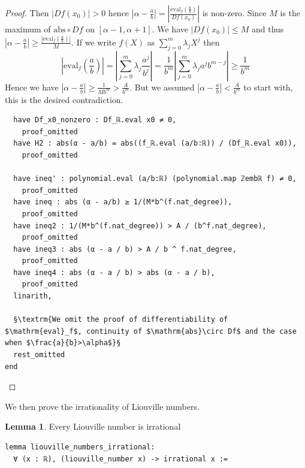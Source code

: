 \documentclass{report}
\theoremstyle{definition}
\newtheorem{lemma}{Lemma}[section]
\begin{document}
\begin{proof}
Then $|Df(x_0)|>0$ hence $\left|\alpha-\frac ab\right|=\left|\frac{\mathrm{eval}_f(\frac a b)}{Df(x_0)}\right|$ is non-zero. Since $M$ is the maximum of $\mathrm{abs}\circ Df$ on $[\alpha-1,\alpha+1]$. We have $|Df(x_0)|\le M$ and thus $\left|\alpha-\frac ab\right|\ge \frac{|\mathrm{eval}_f(\frac a b)|}{M}$. If we write $f(X)$ as $\sum_{j=0}^m \lambda_j X^j$ then
\begin{equation*}
\left|\mathrm{eval}_f\left(\frac a b\right)\right|=\left|\sum_{j=0}^m\lambda_j \frac{a^j}{b^j}\right|= \frac1{b^m}\left|\sum_{j=0}^m\lambda_j a^jb^{m-j}\right|\ge\frac1{b^m}
\end{equation*}
Hence we have $\left|\alpha-\frac a b\right|\ge \frac1{Mb^m}>\frac{A}{b^m}$. But we assumed $\left|\alpha-\frac ab\right|<\frac A{b^m}$ to start with, this is the desired contradiction.

\begin{verbatim}
  have Df_x0_nonzero : Df_ℝ.eval x0 ≠ 0,
    proof_omitted
  have H2 : abs(α - a/b) = abs((f_ℝ.eval (a/b:ℝ)) / (Df_ℝ.eval x0)),
    proof_omitted

  have ineq' : polynomial.eval (a/b:ℝ) (polynomial.map ℤembℝ f) ≠ 0,
    proof_omitted
  have ineq : abs (α - a/b) ≥ 1/(M*b^(f.nat_degree)),
    proof_omitted
  have ineq2 : 1/(M*b^(f.nat_degree)) > A / (b^f.nat_degree),
    proof_omitted
  have ineq3 : abs (α - a / b) > A / b ^ f.nat_degree,
    proof_omitted
  have ineq4 : abs (α - a / b) > abs (α - a / b),
    proof_omitted 
  linarith,
  
  §\textrm{We omit the proof of differentiability of $\mathrm{eval}_f$, continuity of $\mathrm{abs}\circ Df$ and the case when $\frac{a}{b}>\alpha$}§
  rest_omitted
end
\end{verbatim}
\end{proof}

We then prove the irrationality of Liouville numbers.
\begin{lemma}
Every Liouville number is irrational
\begin{verbatim} 
lemma liouville_numbers_irrational: 
  ∀ (x : ℝ), (liouville_number x) -> irrational x :=
\end{verbatim}
\end{lemma}
\end{document}
